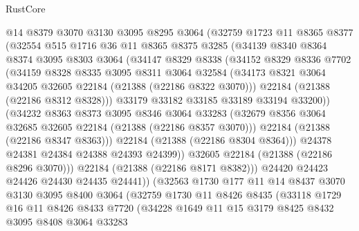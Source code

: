 \begin{lexlean}{RustCore}
\begin{coremodule}
            @14
            @8379
            @3070
            @3130
            @3095
            @8295
            @3064
            (@32759
              @1723
              @11
              @8365
              @8377
              (@32554
                @515
                @1716
                @36
                @11
                @8365
                @8375
                @3285
                (@34139
                  @8340
                  @8364
                  @8374
                  @3095
                  @8303
                  @3064
                  (@34147
                    @8329
                    @8338
                    (@34152
                      @8329
                      @8336
                      @7702
                      (@34159
                        @8328
                        @8335
                        @3095
                        @8311
                        @3064
                        @32584
                        (@34173 @8321 @3064 @34205 @32605 @22184 (@21388 (@22186 @8322 @3070)))
                        @22184
                        (@21388 (@22186 @8312 @8328)))
                      @33179
                      @33182
                      @33185
                      @33189
                      @33194
                      @33200))
                  (@34232
                    @8363
                    @8373
                    @3095
                    @8346
                    @3064
                    @33283
                    (@32679 @8356 @3064 @32685 @32605 @22184 (@21388 (@22186 @8357 @3070)))
                    @22184
                    (@21388 (@22186 @8347 @8363)))
                  @22184
                  (@21388 (@22186 @8304 @8364)))
                @24378
                @24381
                @24384
                @24388
                @24393
                @24399))
            @32605
            @22184
            (@21388 (@22186 @8296 @3070)))
          @22184
          (@21388 (@22186 @8171 @8382)))
        @24420
        @24423
        @24426
        @24430
        @24435
        @24441))
    (@32563
      @1730
      @177
      @11
      @14
      @8437
      @3070
      @3130
      @3095
      @8400
      @3064
      (@32759
        @1730
        @11
        @8426
        @8435
        (@33118
          @1729
          @16
          @11
          @8426
          @8433
          @7720
          (@34228
            @1649
            @11
            @15
            @3179
            @8425
            @8432
            @3095
            @8408
            @3064
            @33283

\end{coremodule}
\end{lexlean}
